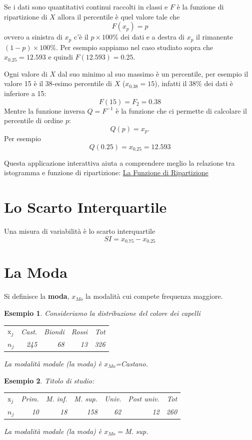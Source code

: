 \documentclass[
  11pt,
]{book}
\theoremstyle{mytheoremstyle}
\theoremstyle{mydefstyle}
\newtheorem{example}{{Esempio}}[section]
\begin{document}
Se i dati sono quantitativi continui raccolti in classi e \(F\) è la funzione di
ripartizione di \(X\) allora il percentile è quel valore tale che
\[
F(x_p)=p
\]
ovvero a sinistra di \(x_p\) c'è il \(p\times 100\%\) dei dati e a destra di \(x_p\)
il rimanente \((1-p)\times 100\%\). Per esempio sappiamo nel caso studiato sopra che
\(x_{0.25}=12.593\) e quindi \(F(12.593)=0.25\).

Ogni valore di \(X\) dal suo minimo al suo massimo è un percentile, per esempio
il valore 15 è il 38-esimo percentile di \(X\) (\(x_{0.38}=15\)), infatti il 38\%
dei dati è inferiore a 15:
\[
F(15)=F_{2}=0.38
\]
Mentre la funzione inversa \(Q=F^{-1}\) è la funzione che ci permette di calcolare il
percentile di ordine \(p\):
\[
Q(p)=x_p.
\]
Per esempio
\[
Q(0.25)=x_{0.25}=12.593
\]

Questa applicazione interattiva aiuta a comprendere meglio la relazione tra istogramma
e funzione di ripartizione: \href{https://patrizio-frederic.shinyapps.io/FdR_descrittiva/}{La Funzione di Ripartizione}

\section{Lo Scarto Interquartile}\label{sqi}

Una misura di variabilità è lo scarto interquartile
\[
SI = x_{0.75}-x_{0.25}
\]

\section{La Moda}\label{moda}

\begin{info}
Si definisce la \textbf{moda}, \(x_{Mo}\) la modalità cui compete frequenza maggiore.

\end{info}

\begin{example}
Consideriamo la distribuzione del colore dei capelli

\begin{tabular}{lrrrr}
\toprule
$\mathrm{x}_j$ & Cast. & Biondi & Rossi & Tot\\
$n_j$ & 245 & 68 & 13 & 326\\
\bottomrule
\end{tabular}

La modalità modale (la moda) è \(x_{Mo}\)=Castano.
\end{example}

\begin{example}
Titolo di studio:

\begin{tabular}{lrrrrrr}
\toprule
$\mathrm{x}_j$ & Prim. & M. inf. & M. sup. & Univ. & Post univ. & Tot\\
$n_j$ & 10 & 18 & 158 & 62 & 12 & 260\\
\bottomrule
\end{tabular}

La modalità modale (la moda) è \(x_{Mo}=\)M. sup.
\end{example}
\end{document}
